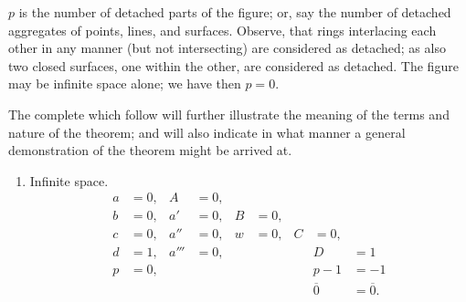 \documentclass[11pt,a4paper]{article}
\theoremstyle{plain}
\theoremstyle{definition}
\begin{document}
$p$ is the number of detached parts of the figure; or, say the number of detached
aggregates of points, lines, and surfaces. Observe, that rings interlacing each other
in any manner (but not intersecting) are considered as detached; as also two closed
surfaces, one within the other, are considered as detached. The figure may be infinite
space alone; we have then $p = 0$.

The complete which follow will further illustrate the meaning of the terms and
nature of the theorem; and will also indicate in what manner a general demonstration
of the theorem might be arrived at.

\begin{enumerate}
\item Infinite space.
\begin{align*}
a &= 0, & A &= 0, \\
b &= 0, & a' &= 0, & B &= 0, \\
c &= 0, & a'' &= 0, & w &= 0, & C &= 0, \\
d &= 1, & a''' &= 0, & & & & D &= 1 \\
p &= 0, & & & & & & p - 1 &= -1 \\[2pt]
& & & & & & & \overline{0} &= \overline{0}.
\end{align*}
\end{enumerate}

\clearpage
\end{document}
